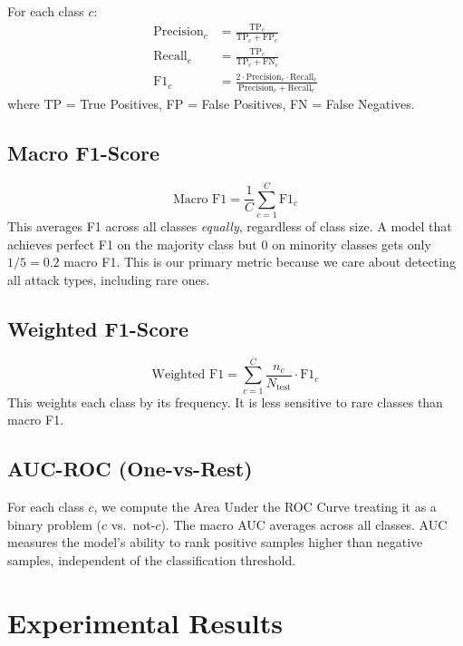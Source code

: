 \documentclass[conference]{IEEEtran}
\begin{document}
For each class $c$:
\begin{align}
    \text{Precision}_c &= \frac{\text{TP}_c}{\text{TP}_c + \text{FP}_c} \\
    \text{Recall}_c &= \frac{\text{TP}_c}{\text{TP}_c + \text{FN}_c} \\
    \text{F1}_c &= \frac{2 \cdot \text{Precision}_c \cdot \text{Recall}_c}{\text{Precision}_c + \text{Recall}_c}
\end{align}
where TP = True Positives, FP = False Positives, FN = False Negatives.

\subsection{Macro F1-Score}

\begin{equation}
    \text{Macro F1} = \frac{1}{C} \sum_{c=1}^{C} \text{F1}_c
\end{equation}
This averages F1 across all classes \emph{equally}, regardless of class size. A model that achieves perfect F1 on the majority class but 0 on minority classes gets only $1/5 = 0.2$ macro F1. This is our primary metric because we care about detecting all attack types, including rare ones.

\subsection{Weighted F1-Score}

\begin{equation}
    \text{Weighted F1} = \sum_{c=1}^{C} \frac{n_c}{N_{\text{test}}} \cdot \text{F1}_c
\end{equation}
This weights each class by its frequency. It is less sensitive to rare classes than macro F1.

\subsection{AUC-ROC (One-vs-Rest)}

For each class $c$, we compute the Area Under the ROC Curve treating it as a binary problem ($c$ vs.\ not-$c$). The macro AUC averages across all classes. AUC measures the model's ability to rank positive samples higher than negative samples, independent of the classification threshold.

\section{Experimental Results}
\label{sec:results}
\end{document}

